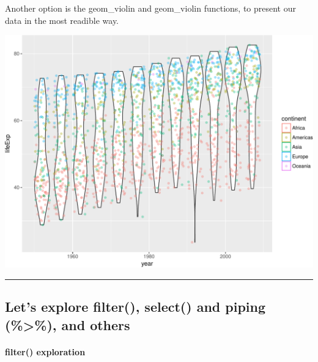 \documentclass[]{article}
\newenvironment{Shaded}{\begin{snugshade}}{\end{snugshade}}
\newcommand{\KeywordTok}[1]{\textcolor[rgb]{0.13,0.29,0.53}{\textbf{{#1}}}}
\newcommand{\DataTypeTok}[1]{\textcolor[rgb]{0.13,0.29,0.53}{{#1}}}
\newcommand{\FloatTok}[1]{\textcolor[rgb]{0.00,0.00,0.81}{{#1}}}
\newcommand{\StringTok}[1]{\textcolor[rgb]{0.31,0.60,0.02}{{#1}}}
\newcommand{\NormalTok}[1]{{#1}}
\let\oldparagraph\paragraph
\renewcommand{\paragraph}[1]{\oldparagraph{#1}\mbox{}}
\begin{document}
Another option is the geom\_violin and geom\_violin functions, to
present our data in the most readible way.

\begin{Shaded}
\end{Shaded}

\includegraphics{gapminder-exploration-phase2_files/figure-latex/unnamed-chunk-27-1.pdf}

\begin{center}\rule{0.5\linewidth}{\linethickness}\end{center}

\subsection{Let's explore filter(), select() and piping
(\%\textgreater{}\%), and
others}\label{lets-explore-filter-select-and-piping-and-others}

\paragraph{filter() exploration}\label{filter-exploration}
\end{document}
